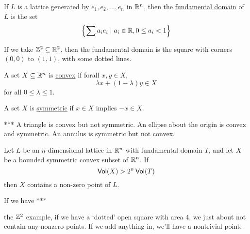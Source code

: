 \begin{definition}
    If $L$ is a lattice generated by $e_1, e_2, \dots, e_n$ in $\mathbb R^n$, then the \ul{fundamental domain} of $L$ is the set
    \[\left\{ \sum a_i e_i \mid a_i\in\mathbb R, 0\leq a_i < 1 \right\}\]
\end{definition}
\begin{example}
    If we take $\mathbb Z^2\subseteq\mathbb R^2$, then the fundamental domain is the square with corners $(0, 0)$ to $(1, 1)$, with some dotted lines.
\end{example}
\begin{definition}
    A set $X\subseteq\mathbb R^n$ is \ul{convex} if forall $x, y\in X$,
    \[\lambda x + (1 - \lambda)y \in X\]
    for all $0\leq \lambda \leq 1$.

    A set $X$ is \ul{symmetric} if $x\in X$ implies $-x\in X$.
\end{definition}
\begin{example}
    *** A triangle is convex but not symmetric. An ellipse about the origin is convex and symmetric. An annulus is symmetric but not convex.
\end{example}
\begin{theorem}
    Let $L$ be an $n$-dimensional lattice in $\mathbb R^n$ with fundamental domain $T$, and let $X$ be a bounded symmetric convex subset of $\mathbb R^n$. If
    \[\operatorname{\mathsf{Vol}}(X) > 2^n\operatorname{\mathsf{Vol}}(T)\]
    then $X$ contains a non-zero point of $L$.
\end{theorem}
\begin{example}
    If we have
    ***
    \begin{center}
    \end{center}
    the $\mathbb Z^2$ example, if we have a `dotted' open square with area $4$, we just about not contain any nonzero points. If we add anything in, we'll have a nontrivial point.
\end{example}

